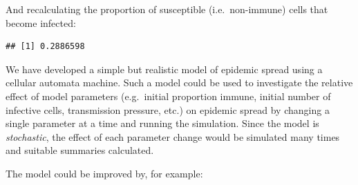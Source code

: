 \documentclass[12pt,a4paper]{book}
\newenvironment{Shaded}{\begin{snugshade}}{\end{snugshade}}
\newcommand{\KeywordTok}[1]{\textcolor[rgb]{0.13,0.29,0.53}{\textbf{#1}}}
\newcommand{\StringTok}[1]{\textcolor[rgb]{0.31,0.60,0.02}{#1}}
\newcommand{\OperatorTok}[1]{\textcolor[rgb]{0.81,0.36,0.00}{\textbf{#1}}}
\newcommand{\NormalTok}[1]{#1}
\theoremstyle{definition}
\theoremstyle{definition}
\theoremstyle{definition}
\theoremstyle{remark}
\begin{document}
And recalculating the proportion of susceptible (i.e.~non-immune) cells
that become infected:

\begin{Shaded}
\end{Shaded}

\begin{verbatim}
## [1] 0.2886598
\end{verbatim}

We have developed a simple but realistic model of epidemic spread using
a cellular automata machine. Such a model could be used to investigate
the relative effect of model parameters (e.g.~initial proportion immune,
initial number of infective cells, transmission pressure, etc.) on
epidemic spread by changing a single parameter at a time and running the
simulation. Since the model is \emph{stochastic}, the effect of each
parameter change would be simulated many times and suitable summaries
calculated.

The model could be improved by, for example:
\end{document}
